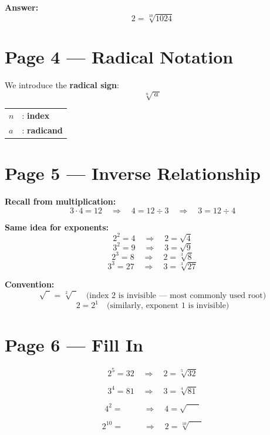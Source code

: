\documentclass[12pt]{article}
\begin{document}
\bigskip

\textbf{Answer:}
\[
\boxed{2 = \sqrt[10]{1024}}
\]

\newpage
\section*{Page 4 — Radical Notation}

We introduce the \textbf{radical sign}:
\[
\sqrt[n]{\,a\,}
\]

\begin{center}
\begin{tabular}{ll}
$n$ & : \textbf{index} \\[4pt]
$a$ & : \textbf{radicand} \\
\end{tabular}
\end{center}

\newpage
\section*{Page 5 — Inverse Relationship}

\textbf{Recall from multiplication:}
\[
3 \cdot 4 = 12
\quad \Rightarrow \quad
4 = 12 \div 3
\quad \Rightarrow \quad
3 = 12 \div 4
\]

\bigskip

\textbf{Same idea for exponents:}
\[
2^{2} = 4 \quad \Rightarrow \quad 2 = \sqrt{4}
\]
\[
3^{2} = 9 \quad \Rightarrow \quad 3 = \sqrt{9}
\]
\[
2^{3} = 8 \quad \Rightarrow \quad 2 = \sqrt[3]{8}
\]
\[
3^{3} = 27 \quad \Rightarrow \quad 3 = \sqrt[3]{27}
\]

\bigskip

\textbf{Convention:}
\[
\sqrt{\phantom{0}} = \sqrt[2]{\phantom{0}}
\quad \text{(index 2 is invisible — most commonly used root)}
\]
\[
2 = 2^{1}
\quad \text{(similarly, exponent 1 is invisible)}
\]

\newpage
\section*{Page 6 — Fill In}

\[
2^{5} = \boxed{32}
\quad \Rightarrow \quad
2 = \sqrt[5]{32}
\]

\[
3^{4} = \boxed{81}
\quad \Rightarrow \quad
3 = \sqrt[4]{81}
\]

\[
4^{2} = \boxed{\phantom{000}}
\quad \Rightarrow \quad
4 = \sqrt{\phantom{000}}
\]

\[
2^{10} = \boxed{\phantom{000}}
\quad \Rightarrow \quad
2 = \sqrt[10]{\phantom{000}}
\]
\end{document}
